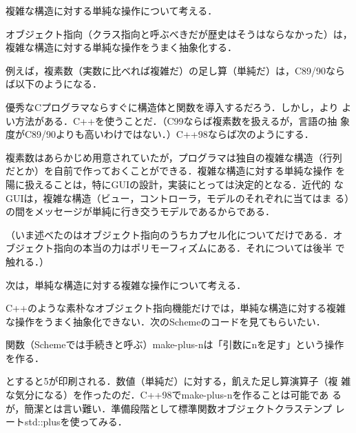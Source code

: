 \documentclass[a5paper,twoside,fleqn]{jsbook}
\begin{document}
複雑な構造に対する単純な操作について考える．

オブジェクト指向（クラス指向と呼ぶべきだが歴史はそうはならなかった）は，
複雑な構造に対する単純な操作をうまく抽象化する．

例えば，複素数（実数に比べれば複雑だ）の足し算（単純だ）は，C89/90なら
ば以下のようになる．


優秀なCプログラマならすぐに構造体と関数を導入するだろう．しかし，より
よい方法がある．C++を使うことだ．（C99ならば複素数を扱えるが，言語の抽
  象度がC89/90よりも高いわけではない．）C++98ならば次のようにする．


複素数はあらかじめ用意されていたが，プログラマは独自の複雑な構造（行列
だとか）を自前で作っておくことができる．複雑な構造に対する単純な操作
を陽に扱えることは，特にGUIの設計，実装にとっては決定的となる．近代的
なGUIは，複雑な構造（ビュー，コントローラ，モデルのそれぞれに当てはま
る）の間をメッセージが単純に行き交うモデルであるからである．

（いま述べたのはオブジェクト指向のうちカプセル化についてだけである．オ
ブジェクト指向の本当の力はポリモーフィズムにある．それについては後半
で触れる．）

次は，単純な構造に対する複雑な操作について考える．

C++のような素朴なオブジェクト指向機能だけでは，単純な構造に対する複雑
な操作をうまく抽象化できない．次のSchemeのコードを見てもらいたい．


関数（Schemeでは手続きと呼ぶ）make-plus-nは「引数にnを足す」という操作
を作る．


とすると5が印刷される．数値（単純だ）に対する，飢えた足し算演算子（複
  雑な気分になる）を作ったのだ．C++98でmake-plus-nを作ることは可能であ
るが，簡潔とは言い難い．準備段階として標準関数オブジェクトクラステンプ
レートstd::plusを使ってみる．
\end{document}
